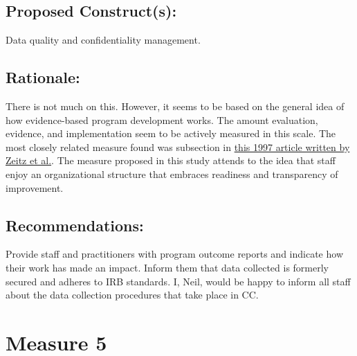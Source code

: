 \documentclass[]{article}
\begin{document}
\subsection{\texorpdfstring{\textbf{Proposed
Construct(s)}:}{Proposed Construct(s):}}\label{proposed-constructs-3}

Data quality and confidentiality management.

\subsection{\texorpdfstring{\textbf{Rationale}:}{Rationale:}}\label{rationale-3}

There is not much on this. However, it seems to be based on the general
idea of how evidence-based program development works. The amount
evaluation, evidence, and implementation seem to be actively measured in
this scale. The most closely related measure found was subsection in
\href{http://journals.sagepub.com/doi/pdf/10.1177/1059601197224002}{this
1997 article written by Zeitz et al.}. The measure proposed in this
study attends to the idea that staff enjoy an organizational structure
that embraces readiness and transparency of improvement.

\subsection{\texorpdfstring{\textbf{Recommendations}:}{Recommendations:}}\label{recommendations-3}

Provide staff and practitioners with program outcome reports and
indicate how their work has made an impact. Inform them that data
collected is formerly secured and adheres to IRB standards. I, Neil,
would be happy to inform all staff about the data collection procedures
that take place in CC.

\section{Measure 5}\label{measure-5}
\end{document}
